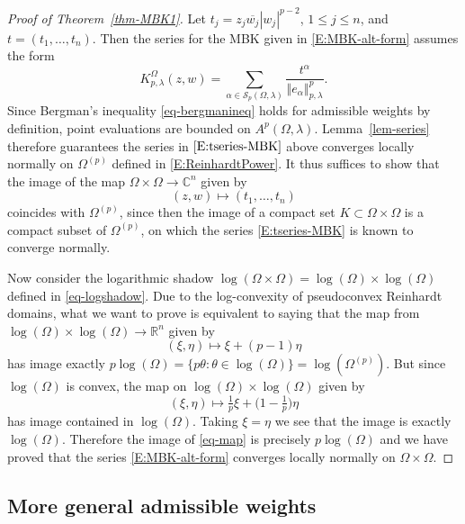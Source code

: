\documentclass[letterpaper,11pt,reqno]{amsart}
\theoremstyle{plain}
\theoremstyle{definition}
\theoremstyle{remark}
\theoremstyle{remark}
\numberwithin{equation}{section}
\newcommand{\abs}[1]{\left\vert#1\right\vert}
\newcommand{\norm}[1]{\left\Vert#1\right\Vert}
\newcommand{\ol}{\overline}
\newcommand{\cx}{{\mathbb C}}
\newcommand{\rl}{\mathbb R}
\begin{document}
\begin{proof}[Proof of Theorem~\ref{thm-MBK1}]
Let $t_j=z_j\ol{w_j}\abs{w_j}^{p-2}$, $1\le j\le n$, and $t=(t_1,\dots,t_n)$. Then the series for the MBK given in \eqref{E:MBK-alt-form} assumes the form
\begin{equation}\label{E:tseries-MBK}
K^\Omega_{p,\lambda}(z,w)=\sum_{\alpha \in \mathcal{S}_p(\Omega,\lambda)} \frac{t^\alpha}{\norm{e_\alpha}_{p,\lambda}^p}.
\end{equation}
Since Bergman's inequality \eqref{eq-bergmanineq} holds for admissible weights by definition, point evaluations are bounded on $A^p(\Omega,\lambda)$. 
Lemma~\ref{lem-series} therefore guarantees the series in $\eqref{E:tseries-MBK}$ above converges locally  normally on $\Omega^{(p)}$  defined in \eqref{E:ReinhardtPower}. 
It thus suffices to show that the image of the map $\Omega \times \Omega \to \cx^n$ given by
\begin{equation*}
(z,w) \longmapsto (t_1,\dots, t_n)
\end{equation*}
coincides with $\Omega^{(p)}$, since then the image of a compact set $K\subset \Omega\times \Omega$ is a compact subset of $\Omega^{(p)}$, on which the series \eqref{E:tseries-MBK} is known to converge normally. 

Now consider the logarithmic shadow $\log(\Omega \times \Omega) = \log(\Omega)\times\log(\Omega)$ defined in \eqref{eq-logshadow}.
Due to the log-convexity of pseudoconvex Reinhardt domains, what we want to prove is equivalent to saying that the map from $\log(\Omega)\times \log(\Omega)\to \rl^n$ given by
\begin{equation}\label{eq-map}
(\xi, \eta) \longmapsto \xi + (p-1)\eta
\end{equation}
has image exactly $p\log(\Omega) = \{p\theta: \theta \in \log(\Omega)\} = \log\left(\Omega^{(p)}\right)$.  But since $\log(\Omega)$ is convex, the map on $\log(\Omega) \times \log(\Omega)$ given by
\begin{equation*}
(\xi, \eta) \longmapsto \tfrac{1}{p}\xi + \big(1-\tfrac{1}{p}\big)\eta 
\end{equation*}
has image contained in $\log(\Omega)$. 
Taking $\xi=\eta$ we see that the image is exactly $\log(\Omega)$. 
Therefore the image of \eqref{eq-map} is precisely $p\log(\Omega)$ and  we have proved that the series \eqref{E:MBK-alt-form} converges locally normally on $\Omega\times\Omega$.
\end{proof}

\subsection{More general admissible weights}\label{SS:GenAdmWeights}
  
\end{document}
